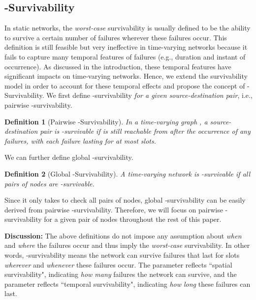 \documentclass[10pt, conference, letterpaper]{IEEEtran}
\newtheorem{definition}{Definition}
\begin{document}
\subsection{-Survivability}
In static networks, the \emph{worst-case} survivability is usually defined to be the ability to survive a certain number of failures wherever these failures occur. This definition is still feasible but very ineffective in time-varying networks because it fails to capture many temporal features of failures (e.g., duration and instant of occurrence). As discussed in the introduction, these temporal features  have significant impacts on time-varying networks. Hence, we extend the survivability model in order to account for these temporal effects and propose the concept of -Survivability.
We first define -survivability \emph{for a given source-destination pair}, i.e., pairwise -survivability.

\begin{definition}[{Pairwise -Survivability}]\label{local_def}
In a time-varying graph , a source-destination pair  is -survivable if  is still reachable from  after the occurrence of any  failures, with each failure lasting for at most  slots.
\end{definition}

\noindent We can further define global -survivability.

\begin{definition}[{Global -Survivability}] A time-varying network is -survivable if all pairs of nodes are -survivable.
\end{definition}

\noindent Since it only takes  to check all pairs of nodes, global -survivability can be easily derived from pairwise -survivability. Therefore, we will focus on pairwise -survivability for a given pair of nodes  throughout the rest of this paper.

\vspace{1mm}

\noindent \textbf{Discussion:} The above definitions do not impose any assumption about \emph{when} and \emph{where} the  failures occur and thus imply the \emph{worst-case} survivability. In other words, -survivability means the network can survive  failures that last for  slots \emph{wherever} and \emph{whenever} these failures occur. The parameter  reflects ``spatial survivability", indicating \emph{how many} failures the network can survive, and the parameter  reflects ``temporal survivability", indicating \emph{how long} these failures can last.
\end{document}
